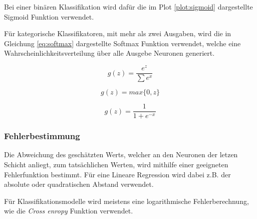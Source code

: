 Bei einer binären Klassifikation wird dafür
die im Plot \ref{plot:sigmoid} dargestellte Sigmoid Funktion 
verwendet.

Für kategorische Klassifikatoren, mit mehr als zwei 
Ausgaben, wird die in Gleichung \ref{eq:softmax}
dargestellte Softmax Funktion verwendet, 
welche eine Wahrscheinlichkeitsverteilung
über alle Ausgebe Neuronen generiert.

\begin{equation}
    \label{eq:softmax}
    g(z) = \frac{e^{z}}{\sum e^{x}}
\end{equation}
\newpage
\begin{minipage}{0.5\textwidth}
    \centering
    \begin{equation*}
        \label{eq:relu}
        g(z) = max\{0,z\}
    \end{equation*}
\end{minipage}
\vspace{1cm}
\begin{minipage}{0.5\textwidth}
    \centering
    \begin{equation*}
        \label{eq:sidmoid}
        g(z) = \frac{1}{1 + e^{-x}}
    \end{equation*}    
\end{minipage}
\begin{minipage}{0.5\textwidth}
    \centering
    
    \label{plot:relu}
\end{minipage}
\begin{minipage}{0.5\textwidth}
    \centering
    
    \label{plot:sigmoid}
\end{minipage}
\vspace{1cm}





\subsubsection{Fehlerbestimmung}
Die Abweichung des geschätzten Werts, welcher an den Neuronen
der letzen Schicht anliegt, zum tatsächlichen Werten,
wird mithilfe einer geeigneten Fehlerfunktion bestimmt.
Für eine Lineare Regression wird dabei z.B.
der absolute oder quadratischen Abstand verwendet.

Für Klassifikationsmodelle wird meistens eine logarithmische
Fehlerberechnung, wie die \textit{Cross enropy} Funktion verwendet.

